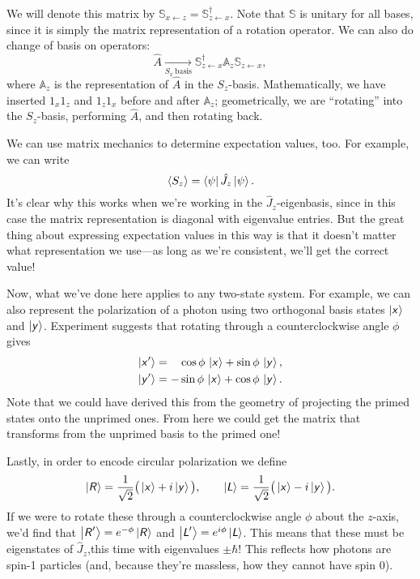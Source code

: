\documentclass[../p116main.tex]{subfiles}
\begin{document}
We will denote this matrix by $\mathbb S_{x \leftarrow z} = \mathbb S_{z \leftarrow x}^\dagger$.
Note that $\mathbb S$ is unitary for all bases, since it is simply the matrix representation of a rotation operator.
We can also do change of basis on operators:
\[ \hat A \xrightarrow[{S_x \,\textrm{basis}}]{} \mathbb S_{z \leftarrow x}^\dagger \mathbb A_z \mathbb S_{z \leftarrow x}, \]
where $\mathbb A_z$ is the representation of $\hat A$ in the $S_z$-basis.
Mathematically, we have inserted $1_x 1_z$ and $1_z 1_x$ before and after $\mathbb A_{z}$; geometrically, we are ``rotating'' into the $S_z$-basis, performing $\hat A$, and then rotating back.

We can use matrix mechanics to determine expectation values, too.
For example, we can write
\[ \langle S_z \rangle = \left< \psi \right| \hat J_z \left| \psi \right>. \]
It's clear why this works when we're working in the $\hat J_z$-eigenbasis, since in this case the matrix representation is diagonal with eigenvalue entries.
But the great thing about expressing expectation values in this way is that it doesn't matter what representation we use---as long as we're consistent, we'll get the correct value!

Now, what we've done here applies to any two-state system.
For example, we can also represent the polarization of a photon using two orthogonal basis states $\left| \textsf{\textit{x}} \right>$ and $\left| \textsf{\textit{y}} \right>$.
Experiment suggests that rotating through a counterclockwise angle $\phi$ gives \vspace{-10pt}
\begin{align*}
    \left| \textsf{\textit{x}}' \right> &= \phantom{-}\cos \phi \, \left| \textsf{\textit{x}} \right> + \sin \phi \, \left| \textsf{\textit{y}} \right>, \\
    \left| \textsf{\textit{y}}' \right> &= -\sin \phi \, \left| \textsf{\textit{x}} \right> + \cos \phi \, \left| \textsf{\textit{y}} \right>.
\end{align*}
Note that we could have derived this from the geometry of projecting the primed states onto the unprimed ones.
From here we could get the matrix that transforms from the unprimed basis to the primed one!

\pagebreak

Lastly, in order to encode circular polarization we define
\[ \left| \textsf{\textit{R}} \right> = \frac{1}{\sqrt{2}} \big( \left| \textsf{\textit{x}} \right> + i \left| \textsf{\textit{y}} \right> \big), \qquad \left| \textsf{\textit{L}} \right> = \frac{1}{\sqrt{2}} \big( \left| \textsf{\textit{x}} \right> - i \left| \textsf{\textit{y}} \right> \big). \]
If we were to rotate these through a counterclockwise angle $\phi$ about the $z$-axis, we'd find that $\left| \textsf{\textit{R}}' \right> = e^{-\phi} \left| \textsf{\textit{R}} \right>$ and $\left| \textsf{\textit{L}}' \right> = e^{i\phi} \left| \textsf{\textit{L}} \right>$.
This means that these must be eigenstates of $\hat J_z$,this time with eigenvalues $\pm \hbar$!
This reflects how photons are spin-1 particles (and, because they're massless, how they cannot have spin 0).
\end{document}
